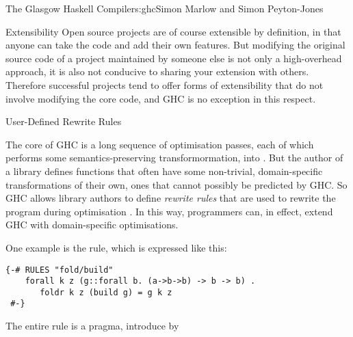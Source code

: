 \begin{aosachapter}{The Glasgow Haskell Compiler}{s:ghc}{Simon Marlow and Simon Peyton-Jones}
\begin{aosasect1}{Extensibility}
Open source projects are of course extensible by definition, in that
anyone can take the code and add their own features.  But modifying
the original source code of a project maintained by someone else is
not only a high-overhead approach, it is also not conducive to sharing
your extension with others.  Therefore successful projects tend to
offer forms of extensibility that do not involve modifying the core
code, and GHC is no exception in this respect.

\begin{aosasect2}{User-Defined Rewrite Rules}
\label{s:rules}

The core of GHC is a long sequence of optimisation passes, each of
which performs some semantics-preserving transformormation, \Core{}
into \Core{}.  But the author of a library defines functions that
often have some non-trivial, domain-specific transformations of their
own, ones that cannot possibly be predicted by GHC. So GHC allows
library authors to define \emph{rewrite rules} that are used to
rewrite the program during optimisation
\cite{bib:playing-by-the-rules}.  In this way, programmers can,
in effect, extend GHC with domain-specific optimisations.

One example is the  rule, which is expressed like this:
\begin{verbatim}
{-# RULES "fold/build"    
    forall k z (g::forall b. (a->b->b) -> b -> b) . 
       foldr k z (build g) = g k z
 #-}
\end{verbatim}

The entire rule is a pragma, introduce by 
\end{aosasect2}
\end{aosasect1}
\end{aosachapter}
